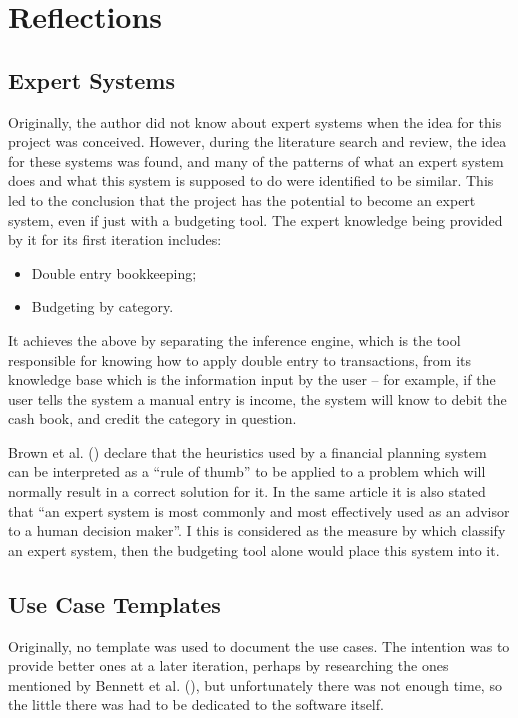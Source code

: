 \section{Reflections} \label{sec:Reflections}

\subsection{Expert Systems} \label{sec:Reflections.ExpertSystems}
Originally, the author did not know about expert systems when the idea for this
project was conceived. However, during the literature search and review, the
idea for these systems was found, and many of the patterns of what an expert
system does and what this system is supposed to do were identified to be
similar. This led to the conclusion that the project has the potential to
become an expert system, even if just with a budgeting tool. The expert
knowledge being provided by it for its first iteration includes:
\begin{itemize}
  \item
    Double entry bookkeeping;

  \item
    Budgeting by category.
\end{itemize}

It achieves the above by separating the inference engine, which is the tool
responsible for knowing how to apply double entry to transactions, from its
knowledge base which is the information input by the user -- for example, if
the user tells the system a manual entry is income, the system will know to
debit the cash book, and credit the category in question.

Brown et al. (\citeyear{brown1990expert}) declare that the heuristics used by a
financial planning system can be interpreted as a ``rule of thumb'' to be
applied to a problem which will normally result in a correct solution for it.
In the same article it is also stated that ``an expert system is most commonly
and most effectively used as an advisor to a human decision maker''. I this is
considered as the measure by which classify an expert system, then the
budgeting tool alone would place this system into it.

\subsection{Use Case Templates} \label{sec:Reflections.UseCaseTemplates}
Originally, no template was used to document the use cases. The intention was
to provide better ones at a later iteration, perhaps by researching the ones
mentioned by Bennett et al. (\citeyear[][p.~157]{bennett2010object}), but
unfortunately there was not enough time, so the little there was had to be
dedicated to the software itself.

